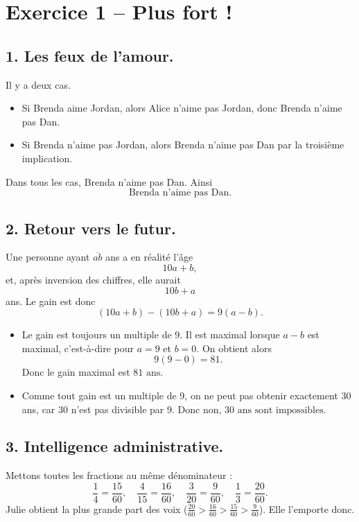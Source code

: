 \section*{Exercice 1 – Plus fort !}

\subsection*{1. Les feux de l'amour.}
Il y a deux cas.
\begin{itemize}
    \item Si Brenda aime Jordan, alors Alice n'aime pas Jordan, donc Brenda n'aime pas Dan.
    \item Si Brenda n'aime pas Jordan, alors Brenda n'aime pas Dan par la troisième implication.
\end{itemize}
Dans tous les cas, Brenda n'aime pas Dan. Ainsi
\[\boxed{\text{Brenda n'aime pas Dan.}}\]

\subsection*{2. Retour vers le futur.}
Une personne ayant \(\overline{ab}\) ans a en réalité l'âge
\[10a + b,\]
et, après inversion des chiffres, elle aurait
\[10b + a\]
ans. Le gain est donc
\[(10a + b) - (10b + a) = 9(a - b).\]

\begin{itemize}
    \item Le gain est toujours un multiple de 9. Il est maximal lorsque \(a - b\) est maximal, c'est-à-dire pour \(a = 9\) et \(b = 0\). On obtient alors
    \[9(9 - 0) = 81.\]
    Donc le gain maximal est \(\boxed{81\text{ ans}}\).
    \item Comme tout gain est un multiple de 9, on ne peut pas obtenir exactement 30 ans, car 30 n'est pas divisible par 9. Donc \(\boxed{\text{non, 30 ans sont impossibles}}\).
\end{itemize}

\subsection*{3. Intelligence administrative.}
Mettons toutes les fractions au même dénominateur :
\[\frac{1}{4} = \frac{15}{60},\quad \frac{4}{15} = \frac{16}{60},\quad \frac{3}{20} = \frac{9}{60},\quad \frac{1}{3} = \frac{20}{60}.\]
Julie obtient la plus grande part des voix ($\frac{20}{60} > \frac{16}{60} > \frac{15}{60} > \frac{9}{60}$). Elle l'emporte donc.

